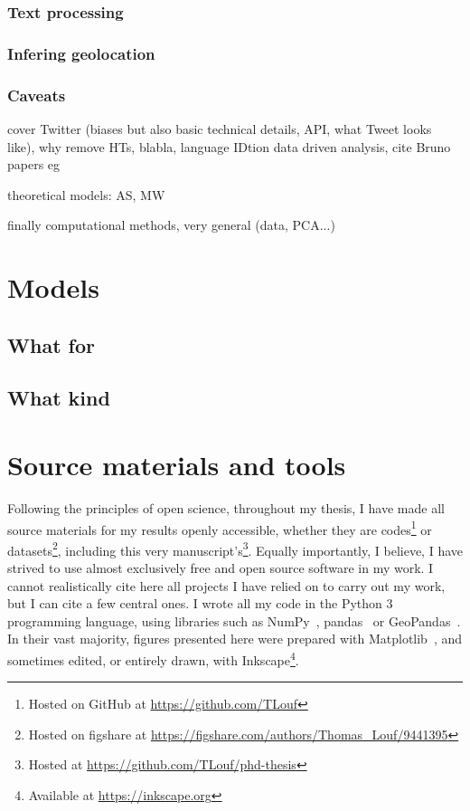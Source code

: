 \documentclass[../thesis.tex]{subfiles}
\begin{document}
\subsubsection{Text processing}

\subsubsection{Infering geolocation}

\subsubsection{Caveats}
cover Twitter (biases but also basic technical details, API, what Tweet looks like), why remove HTs, blabla, language IDtion data driven analysis, cite Bruno papers eg

theoretical models: AS, MW 

finally computational methods, very general (data, PCA...)


\section{Models}

\subsection{What for}

\subsection{What kind}



\section{Source materials and tools}
Following the principles of open science, throughout my thesis, I have made all source
materials for my results openly accessible, whether they are codes\footnote{Hosted on
GitHub at \url{https://github.com/TLouf}} or datasets\footnote{Hosted on figshare at
\url{https://figshare.com/authors/Thomas_Louf/9441395}}, including this very
manuscript's\footnote{Hosted at \url{https://github.com/TLouf/phd-thesis}}. Equally importantly, I believe, I have strived to use almost exclusively free
and open source software in my work. I cannot realistically cite here all projects I
have relied on to carry out my work, but I can cite a few central ones. I wrote all my
code in the Python 3 programming language, using libraries such as
NumPy~\cite{HarrisArrayProgramming2020},
pandas~\cite{teamPandasdevPandas2020} or
GeoPandas~\cite{JordahlGeopandasGeopandas2020}. In their vast majority, figures
presented here were prepared with Matplotlib~\cite{HunterMatplotlib2D2007}, and
sometimes edited, or entirely drawn, with Inkscape\footnote{Available at
\url{https://inkscape.org}}.
\end{document}
